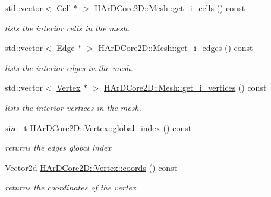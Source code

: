 \begin{DoxyCompactItemize}
std\+::vector$<$ \hyperlink{classHArDCore2D_1_1Cell}{Cell} $\ast$ $>$ \hyperlink{group__Mesh_gab962f4a1a88c7f4910a5e555e01064f3}{H\+Ar\+D\+Core2\+D\+::\+Mesh\+::get\+\_\+i\+\_\+cells} () const
\begin{DoxyCompactList}\small\item\em lists the interior cells in the mesh. \end{DoxyCompactList}\item 
\mbox{\label{group__Mesh_gabaaffe0b8981c9dab16ae34d63262638}} 
std\+::vector$<$ \hyperlink{classHArDCore2D_1_1Edge}{Edge} $\ast$ $>$ \hyperlink{group__Mesh_gabaaffe0b8981c9dab16ae34d63262638}{H\+Ar\+D\+Core2\+D\+::\+Mesh\+::get\+\_\+i\+\_\+edges} () const
\begin{DoxyCompactList}\small\item\em lists the interior edges in the mesh. \end{DoxyCompactList}\item 
\mbox{\label{group__Mesh_ga8f9f78dee50bb3c64136af58ee3468b4}} 
std\+::vector$<$ \hyperlink{classHArDCore2D_1_1Vertex}{Vertex} $\ast$ $>$ \hyperlink{group__Mesh_ga8f9f78dee50bb3c64136af58ee3468b4}{H\+Ar\+D\+Core2\+D\+::\+Mesh\+::get\+\_\+i\+\_\+vertices} () const
\begin{DoxyCompactList}\small\item\em lists the interior vertices in the mesh. \end{DoxyCompactList}\item 
\mbox{\label{group__Mesh_gad19d3dca11de693ac4a454b2263eb179}} 
size\+\_\+t \hyperlink{group__Mesh_gad19d3dca11de693ac4a454b2263eb179}{H\+Ar\+D\+Core2\+D\+::\+Vertex\+::global\+\_\+index} () const
\begin{DoxyCompactList}\small\item\em returns the edges global index \end{DoxyCompactList}\item 
\mbox{\label{group__Mesh_gade92964c93627c034b021c1d23075a79}} 
Vector2d \hyperlink{group__Mesh_gade92964c93627c034b021c1d23075a79}{H\+Ar\+D\+Core2\+D\+::\+Vertex\+::coords} () const
\begin{DoxyCompactList}\small\item\em returns the coordinates of the vertex \end{DoxyCompactList}\item 

\end{DoxyCompactItemize}
